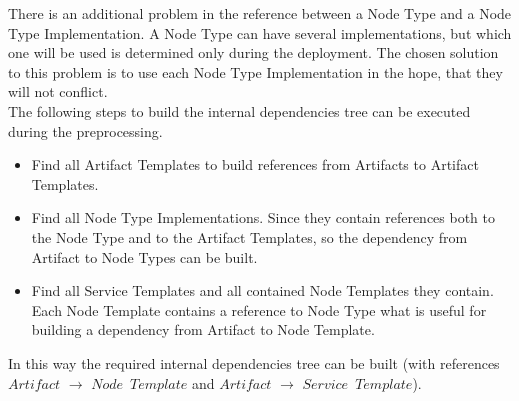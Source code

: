 There is an additional problem in the reference between a Node Type and a Node Type Implementation.
A Node Type can have several implementations, but which one will be used is determined only during the deployment. 
The chosen solution to this problem is to use each Node Type Implementation in the hope, that they will not conflict.\\
The following steps to build the internal dependencies tree can be executed during the preprocessing.
\begin{itemize}
	\item Find all Artifact Templates to build references from Artifacts to Artifact Templates.
	\item Find all Node Type Implementations. Since they contain references both to the Node Type and to the Artifact Templates, so the dependency from Artifact to Node Types can be built.
	\item Find all Service Templates and all contained Node Templates they contain. Each Node Template contains a reference to Node Type what is useful for building a dependency from Artifact to Node Template.
\end{itemize} 
In this way the required internal dependencies tree can be built (with references $Artifact$ $\rightarrow$ $Node$~$Template$ and $Artifact$ $\rightarrow$ $Service$~$Template$).


